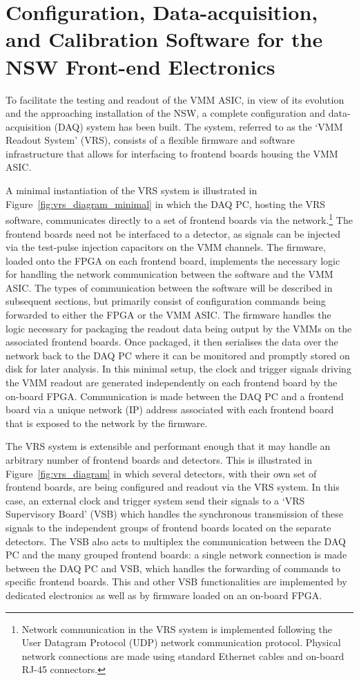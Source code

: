 \section{Configuration, Data-acquisition, and Calibration Software for the NSW Front-end Electronics}
\label{sec:nsw_vrs}

To facilitate the testing and readout of the VMM ASIC, in view of its evolution
and the approaching installation of the NSW, a complete
configuration and data-acquisition (DAQ) system has been built.
The system, referred to as the `VMM Readout System' (VRS), consists of a flexible
firmware and software infrastructure that allows for
interfacing to frontend boards housing the VMM ASIC.

A minimal instantiation of the VRS system is illustrated in Figure~\ref{fig:vrs_diagram_minimal}
in which the DAQ PC, hosting the VRS software, communicates directly to a set
of frontend boards via the network.\footnote{Network communication in the VRS system is implemented following the User Datagram Protocol (UDP) network
communication protocol. Physical network connections are made using standard Ethernet cables and on-board RJ-45 connectors.}
The frontend boards need not be interfaced to a detector, as signals can be injected via
the test-pulse injection capacitors on the VMM channels.
The firmware, loaded onto the FPGA on each frontend board, implements the necessary logic for handling the network communication
between the software and the VMM ASIC.
The types of communication between the software will be described in subsequent sections, but primarily consist of configuration
commands being forwarded to either the FPGA or the VMM ASIC.
The firmware handles the logic necessary for packaging the readout data being
output by the VMMs on the associated frontend boards.
Once packaged, it then serialises the data over the network back to the DAQ PC where it can be monitored
and promptly stored on disk for later analysis.
In this minimal setup, the clock and trigger signals driving the VMM readout are generated independently
on each frontend board by the on-board FPGA.
Communication is made between the DAQ PC and a frontend board via a unique network (IP)
address associated with each frontend board that is exposed to the network by the firmware. 

The VRS system is extensible and performant enough that it may handle an arbitrary number of frontend boards
and detectors.
This is illustrated in Figure~\ref{fig:vrs_diagram} in which several detectors, with their own
set of frontend boards, are being configured and readout via the VRS system.
In this case, an external clock and trigger system send their signals to a `VRS Supervisory Board' (VSB)
which handles the synchronous transmission of these signals to the independent groups of frontend boards
located on the separate detectors.
The VSB also acts to multiplex the communication between the DAQ PC and the many grouped frontend boards:
a single network connection is made between the DAQ PC and VSB, which handles the forwarding of commands to
specific frontend boards.
This and other VSB functionalities are implemented by dedicated electronics as well as by
firmware loaded on an on-board FPGA.

